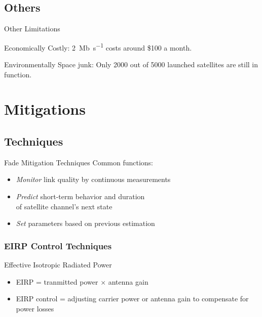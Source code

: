 \documentclass[pdf]{beamer}
\begin{document}
\subsection{Others}
\begin{frame}{Other Limitations}\Large
  \begin{block}{Economically}
    Costly: \SI{2}{\mega b\per\second} costs around \$100 a month.
  \end{block}
  \begin{block}{Environmentally}
    Space junk: Only 2000 out of 5000 launched satellites are still in function.
  \end{block}
\end{frame}

\section{Mitigations}
\frame{\tableofcontents[currentsection]}
\subsection{Techniques}
\begin{frame}{Fade Mitigation Techniques}\Large
  Common functions:
  \begin{itemize}
    \item \emph{Monitor} link quality by continuous measurements
    \item \emph{Predict} short-term behavior and duration\\
      of satellite channel's next state
    \item \emph{Set} parameters based on previous estimation
  \end{itemize}
\end{frame}

\subsubsection{EIRP Control Techniques}
\begin{frame}{Effective Isotropic Radiated Power}\Large
  \begin{itemize}
    \item EIRP = tranmitted power $\times$ antenna gain
    \item EIRP control = adjusting carrier power
      or antenna gain to compensate for power losses
  \end{itemize}
\end{frame}
\end{document}
